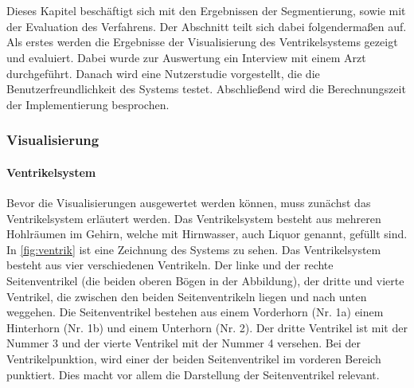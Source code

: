 \chapter{}
\label{sec:results}





Dieses Kapitel beschäftigt sich mit den Ergebnissen der Segmentierung, sowie mit der Evaluation des Verfahrens. Der Abschnitt teilt sich dabei folgendermaßen auf. Als erstes werden die Ergebnisse der Visualisierung des Ventrikelsystems gezeigt und evaluiert. Dabei wurde zur Auswertung ein Interview mit einem Arzt durchgeführt. Danach wird eine Nutzerstudie vorgestellt, die die Benutzerfreundlichkeit des Systems testet. Abschließend wird die Berechnungszeit der Implementierung besprochen.


\subsection{Visualisierung}

\subsubsection{Ventrikelsystem}

Bevor die Visualisierungen ausgewertet werden können, muss zunächst das Ventrikelsystem erläutert werden. Das Ventrikelsystem besteht aus mehreren Hohlräumen im Gehirn, welche mit Hirnwasser, auch Liquor genannt, gefüllt sind. In \autoref{fig:ventrik} ist eine Zeichnung des Systems zu sehen. Das Ventrikelsystem besteht aus vier verschiedenen Ventrikeln. Der linke und der rechte Seitenventrikel (die beiden oberen Bögen in der Abbildung), der dritte und vierte Ventrikel, die zwischen den beiden Seitenventrikeln liegen und nach unten weggehen. Die Seitenventrikel bestehen aus einem Vorderhorn (Nr. 1a)  einem Hinterhorn (Nr. 1b) und einem Unterhorn (Nr. 2). Der dritte Ventrikel ist mit der Nummer 3 und der vierte Ventrikel mit der Nummer 4 versehen. Bei der Ventrikelpunktion, wird einer der beiden Seitenventrikel im vorderen Bereich punktiert. Dies macht vor allem die Darstellung der Seitenventrikel relevant.

